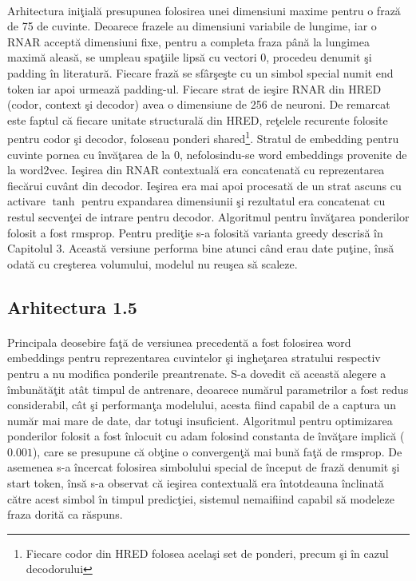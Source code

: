 \paragraph{}
Arhitectura ini\c tial\u a presupunea folosirea unei dimensiuni maxime pentru o fraz\u a de 75 de cuvinte. Deoarece frazele au dimensiuni variabile de lungime, iar o RNAR accept\u a dimensiuni fixe, pentru a completa fraza p\^ an\u a la lungimea maxim\u a aleas\u a, se umpleau spa\c tiile lips\u a cu vectori \(0\), procedeu denumit \c si padding \^ in literatur\u a. Fiecare fraz\u a se sf\^ ar\c se\c ste cu un simbol special numit end token iar apoi urmeaz\u a padding-ul.  Fiecare strat de ie\c sire RNAR din HRED (codor, context \c si decodor) avea o dimensiune de 256 de neuroni. De remarcat este faptul c\u a fiecare unitate structural\u a din HRED, re\c telele recurente folosite pentru codor \c si decodor, foloseau ponderi shared\footnote{Fiecare codor din HRED folosea acela\c si set de ponderi, precum \c si \^ in cazul decodorului}. Stratul de embedding pentru cuvinte pornea cu \^ inv\u a\c tarea de la 0, nefolosindu-se word embeddings provenite de la word2vec. Ie\c sirea din RNAR contextual\u a era concatenat\u a cu reprezentarea fiec\u arui cuv\^ ant din decodor. Ie\c sirea era mai apoi procesat\u a de un strat ascuns cu activare \(\tanh\) pentru expandarea dimensiunii \c si rezultatul era concatenat cu restul secven\c tei de intrare pentru decodor. Algoritmul pentru \^ inv\u a\c tarea ponderilor folosit a fost rmsprop. Pentru predi\c tie s-a folosit\u a varianta greedy descris\u a \^ in Capitolul 3. Aceast\u a versiune performa bine atunci c\^ and erau date pu\c tine, \^ ins\u a odat\u a cu cre\c sterea volumului, modelul nu reu\c sea s\u a scaleze.

\subsection{Arhitectura 1.5}

\paragraph{}
Principala deosebire fa\c t\u a de versiunea precedent\u a a fost folosirea word embeddings pentru reprezentarea cuvintelor \c si inghe\c tarea stratului respectiv pentru a nu modifica ponderile preantrenate. S-a dovedit c\u a aceast\u a alegere a \^ imbun\u at\u a\c tit at\^ at timpul de antrenare, deoarece num\u arul parametrilor a fost redus considerabil, c\^ at \c si performan\c ta modelului, acesta fiind capabil de a captura un num\u ar mai mare de date, dar totu\c si insuficient. Algoritmul pentru optimizarea ponderilor folosit a fost \^ inlocuit cu adam folosind constanta de \^ inv\u a\c tare implic\u a (\(0.001\)), care se presupune c\u a ob\c tine o convergen\c t\u a mai bun\u a fa\c t\u a de rmsprop. De asemenea s-a \^ incercat folosirea simbolului special de \^ inceput de fraz\u a denumit \c si start token, \^ ins\u a s-a observat c\u a ie\c sirea contextual\u a era \^ intotdeauna \^ inclinat\u a c\u atre acest simbol \^ in timpul predic\c tiei, sistemul nemaifiind capabil s\u a modeleze fraza dorit\u a ca r\u aspuns.

